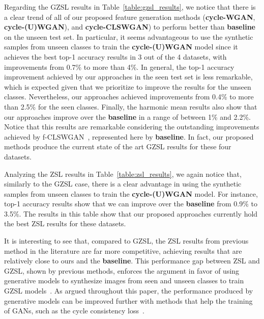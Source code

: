 \documentclass[runningheads]{llncs}
\begin{document}
Regarding the GZSL results in Table~\ref{table:gzsl_results}, we notice that there is a clear trend of all of our proposed feature generation methods (\textbf{cycle-WGAN}, \textbf{cycle-(U)WGAN}), and \textbf{cycle-CLSWGAN}) to perform better than \textbf{baseline} on the unseen test set.  In particular, it seems advantageous to use the synthetic samples from unseen classes to train the \textbf{cycle-(U)WGAN} model since it achieves the best top-1 accuracy results in 3 out of the 4 datasets, with improvements from 0.7\% to more than 4\%.  In general, the top-1 accuracy improvement achieved by our approaches in the seen test set is less remarkable, which is expected given that we prioritize to improve the results for the unseen classes.  Nevertheless, our approaches achieved improvements from 0.4\% to more than 2.5\% for the seen classes.  Finally, the harmonic mean results also show that our approaches improve over the \textbf{baseline} in a range of between 1\% and 2.2\%.  Notice that this results are remarkable considering the outstanding improvements achieved by f-CLSWGAN~\cite{XianCVPR2018}, represented here by \textbf{baseline}.  In fact, our proposed methods produce the current state of the art GZSL results for these four datasets.

Analyzing the ZSL results in Table~\ref{table:zsl_results}, we again notice that, similarly to the GZSL case, there is a clear advantage in using the synthetic samples from unseen classes to train the \textbf{cycle-(U)WGAN} model.  For instance, top-1 accuracy results show that we can improve over the \textbf{baseline} from 0.9\% to 3.5\%. The results  in this table show that our proposed approaches currently hold the best ZSL results for these datasets.

It is interesting to see that, compared to GZSL, the ZSL results from previous method in the literature are far more competitive, achieving results that are relatively close to ours and the \textbf{baseline}.  
This performance gap between ZSL and GZSL, shown by previous methods, enforces the argument in favor of using generative models to synthesize images from seen and unseen classes to train GZSL models~\cite{XianCVPR2018,bucher2017generating,long2017zero}. As argued throughout this paper, the performance produced by generative models can be improved further with methods that help the training of GANs, such as the cycle consistency loss~\cite{CycleGAN2017}. 
\end{document}
